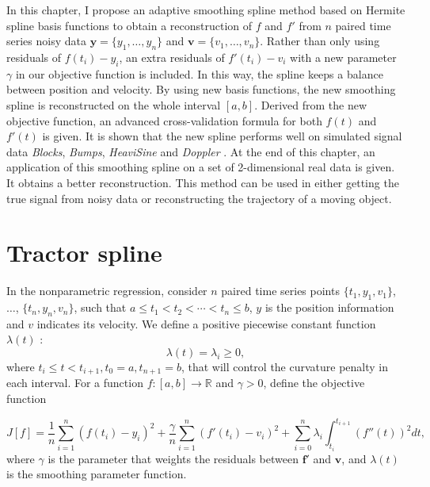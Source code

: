 In this chapter, I propose an adaptive smoothing spline method based on Hermite spline basis functions to obtain a reconstruction of $f$ and $f'$ from $n$ paired time series noisy data $\mathbf{y}=\{y_1,\ldots,y_n\}$ and $\mathbf{v}=\{v_1,\ldots,v_n\}$. Rather than only using residuals of $f(t_i)-y_i$, an extra residuals of $f'(t_i)-v_i$ with a new parameter $\gamma$ in our objective function is included. In this way, the spline keeps a balance between position and velocity. By using new basis functions, the new smoothing spline is reconstructed on the whole interval $\left[a,b\right]$. Derived from the new objective function, an advanced cross-validation formula for both $f(t)$ and $f'(t)$ is given. It is shown that the new spline performs well on simulated signal data \textit{Blocks}, \textit{Bumps}, \textit{HeaviSine} and \textit{Doppler} \cite{donoho1994ideal}. At the end of this chapter, an application of this smoothing spline on a set of 2-dimensional real data is given. It obtains a better reconstruction. This method can be used in either getting the true signal from noisy data or reconstructing the trajectory of a moving object. 


\section{Tractor spline}\label{SectionTractorSpline}


In the nonparametric regression, consider $n$ paired time series points $\{t_1,y_1,v_1\}$, $\ldots$, $\{t_n,y_n,v_n\}$, such that $a \leq t_1<t_2< \cdots < t_n \leq b$, $y$ is the position information and $v$ indicates its velocity. We define a positive piecewise constant function $\lambda(t)$ :
\begin{equation}
\lambda(t) = \lambda_i \geq 0,
\end{equation}
where $t_i \leq t<t_{i+1}, t_0=a, t_{n+1}=b$, that will control the curvature penalty in each interval. For a function $f:[a,b]\rightarrow \mathbb{R}$ and $\gamma>0$, define the objective function 

\begin{equation}\label{tractorsplineObjective}
J[f]= \frac{1}{n} \sum_{i=1}^{n} \left( f(t_i)-y_i \right)^2 + \frac{\gamma}{n} \sum_{i=1}^{n} \left( f'(t_i)-v_i \right)^2 +\sum_{i=0}^{n} \lambda_i\int_{t_i}^{t_{i+1}} \left( f''(t)\right)^2 dt,
\end{equation}
where $\gamma$ is the parameter that weights the residuals between $\mathbf{f}'$ and $\mathbf{v}$, and $\lambda(t)$ is the smoothing parameter function.

